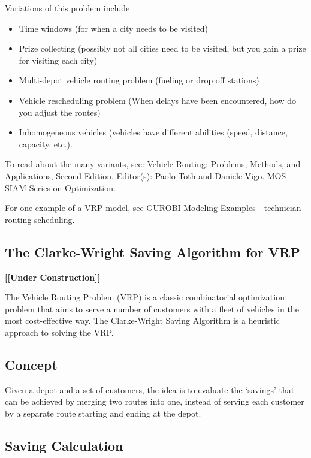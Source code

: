 Variations of this problem include
\begin{itemize}
\item Time windows (for when a city needs to be visited)
\item Prize collecting (possibly not all cities need to be visited, but you gain a prize for visiting each city)
\item Multi-depot vehicle routing problem (fueling or drop off stations)
\item Vehicle rescheduling problem (When delays have been encountered, how do you adjust the routes)
\item Inhomogeneous vehicles (vehicles have different abilities (speed, distance, capacity, etc.).
\end{itemize}

To read about the many variants, see:
\href{https://doi-org.ezproxy.lib.vt.edu/10.1137/1.9781611973594}{
Vehicle Routing: Problems, Methods, and Applications, Second Edition. 
Editor(s): Paolo Toth and Daniele Vigo.  MOS-SIAM Series on Optimization.}


For one example of a VRP model, see \href{https://github.com/Gurobi/modeling-examples/tree/master/technician_routing_scheduling}{GUROBI Modeling Examples - technician routing scheduling}.






\subsection{The Clarke-Wright Saving Algorithm for VRP}
\textbf{[[Under Construction]]}

The Vehicle Routing Problem (VRP) is a classic combinatorial optimization problem that aims to serve a number of customers with a fleet of vehicles in the most cost-effective way. The Clarke-Wright Saving Algorithm is a heuristic approach to solving the VRP. 

\subsection{Concept}

Given a depot and a set of customers, the idea is to evaluate the `savings' that can be achieved by merging two routes into one, instead of serving each customer by a separate route starting and ending at the depot.

\subsection{Saving Calculation}

